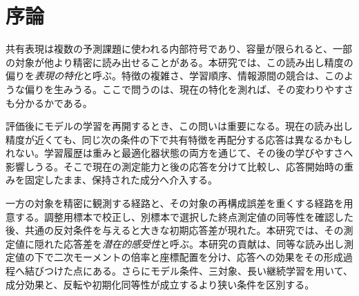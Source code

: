 \graphicspath{{../figures/}}
\begin{abstract}
Adamで学習した小規模な共有表現ネットワークでは、選択した平均読み出し測定値が同等でも、同じ追加学習への応答は異なりうる。本研究は状態への介入によって二次モーメントの倍率と座標配置の効果を分け、その形成過程と時間依存性を調べる。中心となる二対象実験では、より精密に読み出せる対象が10更新以内に切り替わる割合は、取得経路で67.5\%、更新経路で0\%だった。一次モーメント交換による10更新の対比の変化は事前の判定幅内に留まる一方、二次モーメント交換は対比を反転させた。平均的な適応倍率を共通にしても配置の効果が残った。層別交換と移動量の制御は、全体の更新幅だけでは説明できない効果を特定した。形成中の記録は、小さいencoder二次モーメントと対象間の勾配の強い相殺を結びつけた。前向きの勾配射影実験はこの保持状態を変え、その二次モーメントだけを固定した学習器へ移すと10更新の適応応答が小さくなった。同等終点の比較は三Gaussian対象へ広がった一方、部屋のセンサ実験では成分効果が残っても終点一致は成立しなかった。検証した条件では、成分効果は反転や初期化同等性より広く成立した。効果の大きさと持続時間は学習条件に依存した。

\end{abstract}

\section{序論}
\label{sec:intro}
共有表現は複数の予測課題に使われる内部符号であり、容量が限られると、一部の対象が他より精密に読み出せることがある。本研究では、この読み出し精度の偏りを\emph{表現の特化}と呼ぶ。特徴の複雑さ、学習順序、情報源間の競合は、このような偏りを生みうる\citep{lampinen2024biased,pezeshki2021gradient,huang2022modality}。ここで問うのは、現在の特化を測れば、その変わりやすさも分かるかである。

評価後にモデルの学習を再開するとき、この問いは重要になる。現在の読み出し精度が近くても、同じ次の条件の下で共有特徴を再配分する応答は異なるかもしれない。学習履歴は重みと最適化器状態の両方を通じて、その後の学びやすさへ影響しうる\citep{achille2019critical,lyle2023plasticity,dohare2024plasticity}。そこで現在の測定能力と後の応答を分けて比較し、応答開始時の重みを固定したまま、保持された成分へ介入する。

一方の対象を精密に観測する経路と、その対象の再構成誤差を重くする経路を用意する。調整用標本で校正し、別標本で選択した終点測定値の同等性を確認した後、共通の反対条件を与えると大きな初期応答差が現れた。本研究では、その測定値に隠れた応答差を\emph{潜在的感受性}と呼ぶ。本研究の貢献は、同等な読み出し測定値の下で二次モーメントの倍率と座標配置を分け、応答への効果をその形成過程へ結びつけた点にある。さらにモデル条件、三対象、長い継続学習を用いて、成分効果と、反転や初期化同等性が成立するより狭い条件を区別する。

